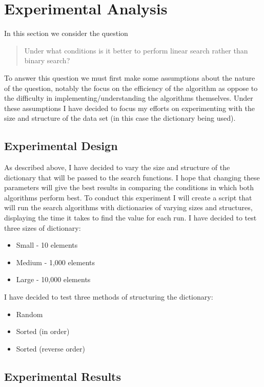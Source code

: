 \documentclass{article}
\begin{document}
\section{Experimental Analysis}
\label{sec:initialExperiments}

In this section we consider the question
	\begin{quote}
	Under what conditions is it better to perform linear search rather than binary search?
	\end{quote}
To answer this question we must first make some assumptions about the nature of the question, notably the focus on the efficiency of the algorithm as oppose to the difficulty in implementing/understanding the algorithms themselves. Under these assumptions I have decided to focus my efforts on experimenting with the size and structure of the data set (in this case the dictionary being used). 

\subsection{Experimental Design}

As described above, I have decided to vary the size and structure of the dictionary that will be passed to the search functions. I hope that changing these parameters will give the best results in comparing the conditions in which both algorithms perform best. To conduct this experiment I will create a script that will run the search algorithms with dictionaries of varying sizes and structures, displaying the time it takes to find the value for each run. 
\newline\newline\newline
I have decided to test three sizes of dictionary:
\begin{itemize}
  \item Small - 10 elements
  \item Medium - 1,000 elements
  \item Large - 10,000 elements
\end{itemize}
I have decided to test three methods of structuring the dictionary:
\begin{itemize}
  \item Random
  \item Sorted (in order)
  \item Sorted (reverse order)
\end{itemize}


\subsection{Experimental Results}
\end{document}
